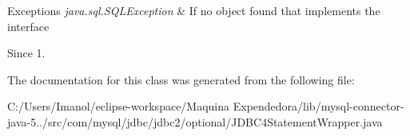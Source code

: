 \begin{DoxyExceptions}{Exceptions}
{\em java.\+sql.\+S\+Q\+L\+Exception} & If no object found that implements the interface \\
\hline
\end{DoxyExceptions}
\begin{DoxySince}{Since}
1. 
\end{DoxySince}


The documentation for this class was generated from the following file\+:\begin{DoxyCompactItemize}
\item 
C\+:/\+Users/\+Imanol/eclipse-\/workspace/\+Maquina Expendedora/lib/mysql-\/connector-\/java-\/5../src/com/mysql/jdbc/jdbc2/optional/J\+D\+B\+C4\+Statement\+Wrapper.\+java\end{DoxyCompactItemize}
